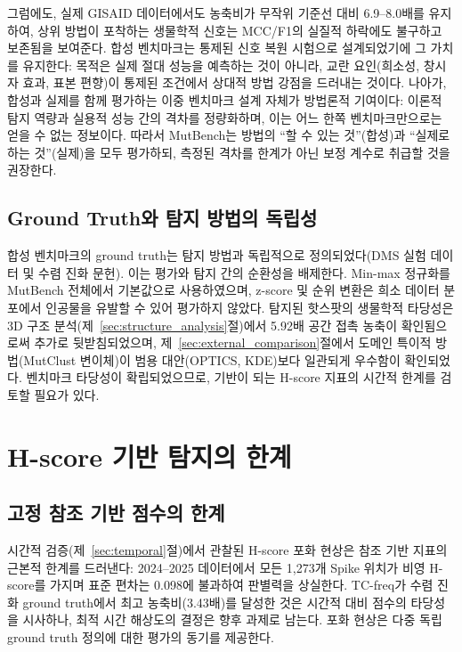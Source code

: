 그럼에도, 실제 GISAID 데이터에서도 농축비가 무작위 기준선 대비 6.9--8.0배를 유지하여, 상위 방법이 포착하는 생물학적 신호는 MCC/F1의 실질적 하락에도 불구하고 보존됨을 보여준다.
합성 벤치마크는 통제된 신호 복원 시험으로 설계되었기에 그 가치를 유지한다: 목적은 실제 절대 성능을 예측하는 것이 아니라, 교란 요인(희소성, 창시자 효과, 표본 편향)이 통제된 조건에서 상대적 방법 강점을 드러내는 것이다.
나아가, 합성과 실제를 함께 평가하는 이중 벤치마크 설계 자체가 방법론적 기여이다: 이론적 탐지 역량과 실용적 성능 간의 격차를 정량화하며, 이는 어느 한쪽 벤치마크만으로는 얻을 수 없는 정보이다.
따라서 MutBench는 방법의 ``할 수 있는 것''(합성)과 ``실제로 하는 것''(실제)을 모두 평가하되, 측정된 격차를 한계가 아닌 보정 계수로 취급할 것을 권장한다.

\subsection{Ground Truth와 탐지 방법의 독립성}
\label{sec:circularity}

합성 벤치마크의 ground truth는 탐지 방법과 독립적으로 정의되었다(DMS 실험 데이터 및 수렴 진화 문헌). 이는 평가와 탐지 간의 순환성을 배제한다.
Min-max 정규화를 MutBench 전체에서 기본값으로 사용하였으며, z-score 및 순위 변환은 희소 데이터 분포에서 인공물을 유발할 수 있어 평가하지 않았다.
탐지된 핫스팟의 생물학적 타당성은 3D 구조 분석(제~\ref{sec:structure_analysis}절)에서 5.92배 공간 접촉 농축이 확인됨으로써 추가로 뒷받침되었으며, 제~\ref{sec:external_comparison}절에서 도메인 특이적 방법(MutClust 변이체)이 범용 대안(OPTICS, KDE)보다 일관되게 우수함이 확인되었다.
벤치마크 타당성이 확립되었으므로, 기반이 되는 H-score 지표의 시간적 한계를 검토할 필요가 있다.

\section{H-score 기반 탐지의 한계}

\subsection{고정 참조 기반 점수의 한계}
\label{sec:hscore_saturation}

시간적 검증(제~\ref{sec:temporal}절)에서 관찰된 H-score 포화 현상은 참조 기반 지표의 근본적 한계를 드러낸다: 2024--2025 데이터에서 모든 1,273개 Spike 위치가 비영 H-score를 가지며 표준 편차는 0.098에 불과하여 판별력을 상실한다.
TC-freq가 수렴 진화 ground truth에서 최고 농축비(3.43배)를 달성한 것은 시간적 대비 점수의 타당성을 시사하나, 최적 시간 해상도의 결정은 향후 과제로 남는다.
포화 현상은 다중 독립 ground truth 정의에 대한 평가의 동기를 제공한다.

